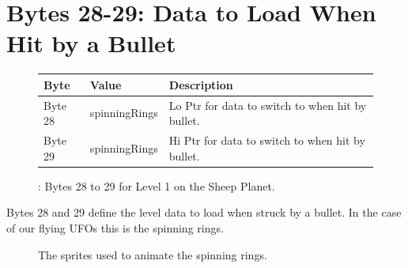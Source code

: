\section{Bytes 28-29: Data to Load When Hit by a Bullet}
\begin{figure}[H]

  {
    \setlength{\tabcolsep}{3.0pt}
    \setlength\cmidrulewidth{\heavyrulewidth} %
    \begin{adjustbox}{width=13cm}

      \begin{tabular}{lll}
        \toprule
        Byte    & Value                     & Description                                                        \\
        \midrule
 Byte 28 & spinningRings             & Lo Ptr for data to switch to when hit by bullet.                                    \\
 Byte 29 & spinningRings             & Hi Ptr for data to switch to when hit by bullet.                                    \\
        \bottomrule
      \end{tabular}
    \end{adjustbox}
  }\caption{: Bytes 28 to 29 for Level 1 on the Sheep Planet.}
\end{figure}

Bytes 28 and 29 define the level data to load when struck by a bullet. In the case of our
flying UFOs this is the spinning rings.

\begin{figure}[H]
  {
    \setlength{\tabcolsep}{1.0pt}
    \setlength\cmidrulewidth{\heavyrulewidth} %
	\centering
	\def\MULTICOLORONE{white}
	\def\MULTICOLORTWO{yellow}
	\def\SPRITECOLOR{yellow}
	\begin{subfigure}{0.23\textwidth}
		
	\end{subfigure}
	\begin{subfigure}{0.23\textwidth}
		
	\end{subfigure}
	\begin{subfigure}{0.23\textwidth}
		
	\end{subfigure}
	\begin{subfigure}{0.23\textwidth}
		
	\end{subfigure}
  }\caption[position=top]{The sprites used to animate the spinning rings.}
\end{figure}

